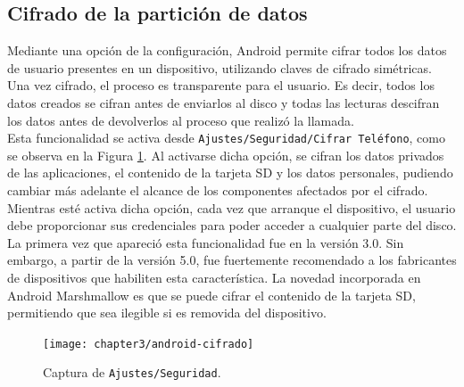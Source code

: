 \subsection{Cifrado de la partición de datos}
Mediante una opción de la configuración, Android permite cifrar todos los datos de usuario presentes en un dispositivo, utilizando claves de cifrado simétricas. Una vez cifrado, el proceso es transparente para el usuario. Es decir, todos los datos creados se cifran antes de enviarlos al disco y todas las lecturas descifran los datos antes de devolverlos al proceso que realizó la llamada.\\
Esta funcionalidad se activa desde \texttt{Ajustes/Seguridad/Cifrar Teléfono}, como se observa en la Figura \ref{fig:ch03:android-cifrado}. Al activarse dicha opción, se cifran los datos privados de las aplicaciones, el contenido de la tarjeta SD y los datos personales, pudiendo cambiar más adelante el alcance de los componentes afectados por el cifrado. Mientras esté activa dicha opción, cada vez que arranque el dispositivo, el usuario debe proporcionar sus credenciales para poder acceder a cualquier parte del disco.\\
La primera vez que apareció esta funcionalidad fue en la versión 3.0. Sin embargo, a partir de la versión 5.0, fue fuertemente recomendado a los fabricantes de dispositivos que habiliten esta característica. La novedad incorporada en Android Marshmallow es que se puede cifrar el contenido de la tarjeta SD, permitiendo que sea ilegible si es removida del dispositivo.\\
\begin{figure}[hbtp]
	\begin{center}
		\texttt{[image: chapter3/android-cifrado]}
		\caption{Captura de \texttt{Ajustes/Seguridad}.}
		\label{fig:ch03:android-cifrado}
	\end{center}
\end{figure}

